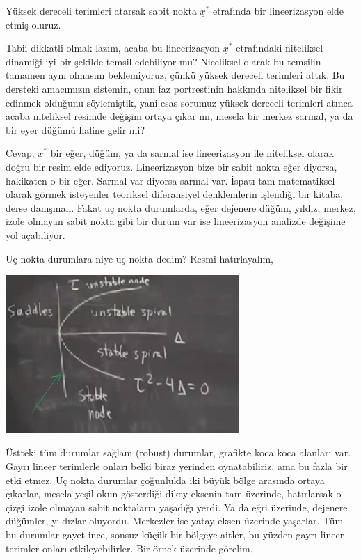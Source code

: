 \documentclass[12pt,fleqn]{article}\usepackage{../../common}
\begin{document}
Yüksek dereceli terimleri atarsak sabit nokta $\underline{x}^\ast$ etrafında bir
lineerizasyon elde etmiş oluruz.

Tabii dikkatli olmak lazım, acaba bu lineerizasyon $\underline{x}^\ast$ etrafındaki
niteliksel dinamiği iyi bir şekilde temsil edebiliyor mu? Niceliksel olarak bu
temsilin tamamen aynı olmasını beklemiyoruz, çünkü yüksek dereceli terimleri
attık. Bu dersteki amacımızın sistemin, onun faz portrestinin hakkında
niteliksel bir fikir edinmek olduğunu söylemiştik, yani esas sorumuz yüksek
dereceli terimleri atınca acaba niteliksel resimde değişim ortaya çıkar mı,
mesela bir merkez sarmal, ya da bir eyer düğümü haline gelir mi?

Cevap, $x^\ast$ bir eğer, düğüm, ya da sarmal ise lineerizasyon ile niteliksel
olarak doğru bir resim elde ediyoruz. Lineerizasyon bize bir sabit nokta eğer
diyorsa, hakikaten o bir eğer. Sarmal var diyorsa sarmal var. İspatı tam
matematiksel olarak görmek isteyenler teoriksel diferansiyel denklemlerin
işlendiği bir kitaba, derse danışmalı. Fakat uç nokta durumlarda, eğer dejenere
düğüm, yıldız, merkez, izole olmayan sabit nokta gibi bir durum var ise
lineerizasyon analizde değişime yol açabiliyor.

Uç nokta durumlara niye uç nokta dedim? Resmi hatırlayalım,

\includegraphics[height=6cm]{06_01.png}

Üstteki tüm durumlar sağlam (robust) durumlar, grafikte koca koca alanları
var. Gayrı lineer terimlerle onları belki biraz yerinden oynatabiliriz, ama bu
fazla bir etki etmez. Uç nokta durumlar çoğunlukla iki büyük bölge arasında
ortaya çıkarlar, mesela yeşil okun gösterdiği dikey eksenin tam üzerinde,
hatırlarsak o çizgi izole olmayan sabit noktaların yaşadığı yerdi. Ya da eğri
üzerinde, dejenere düğümler, yıldızlar oluyordu. Merkezler ise yatay eksen
üzerinde yaşarlar. Tüm bu durumlar gayet ince, sonsuz küçük bir bölgeye aitler,
bu yüzden gayrı lineer terimler onları etkileyebilirler. Bir örnek üzerinde
görelim,
\end{document}
